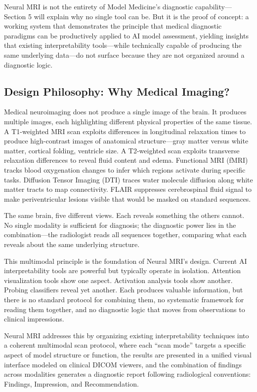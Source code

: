 \documentclass[11pt]{article}
\begin{document}
Neural MRI is not the entirety of Model Medicine's diagnostic capability---Section 5 will explain why no single tool can be. But it is the proof of concept: a working system that demonstrates the principle that medical diagnostic paradigms can be productively applied to AI model assessment, yielding insights that existing interpretability tools---while technically capable of producing the same underlying data---do not surface because they are not organized around a diagnostic logic.

\subsection{Design Philosophy: Why Medical Imaging?}

Medical neuroimaging does not produce a single image of the brain. It produces multiple images, each highlighting different physical properties of the same tissue. A T1-weighted MRI scan exploits differences in longitudinal relaxation times to produce high-contrast images of anatomical structure---gray matter versus white matter, cortical folding, ventricle size. A T2-weighted scan exploits transverse relaxation differences to reveal fluid content and edema. Functional MRI (fMRI) tracks blood oxygenation changes to infer which regions activate during specific tasks. Diffusion Tensor Imaging (DTI) traces water molecule diffusion along white matter tracts to map connectivity. FLAIR suppresses cerebrospinal fluid signal to make periventricular lesions visible that would be masked on standard sequences.

The same brain, five different views. Each reveals something the others cannot. No single modality is sufficient for diagnosis; the diagnostic power lies in the combination---the radiologist reads all sequences together, comparing what each reveals about the same underlying structure.

This multimodal principle is the foundation of Neural MRI's design. Current AI interpretability tools are powerful but typically operate in isolation. Attention visualization tools show one aspect. Activation analysis tools show another. Probing classifiers reveal yet another. Each produces valuable information, but there is no standard protocol for combining them, no systematic framework for reading them together, and no diagnostic logic that moves from observations to clinical impressions.

Neural MRI addresses this by organizing existing interpretability techniques into a coherent multimodal scan protocol, where each ``scan mode'' targets a specific aspect of model structure or function, the results are presented in a unified visual interface modeled on clinical DICOM viewers, and the combination of findings across modalities generates a diagnostic report following radiological conventions: Findings, Impression, and Recommendation.
\end{document}
